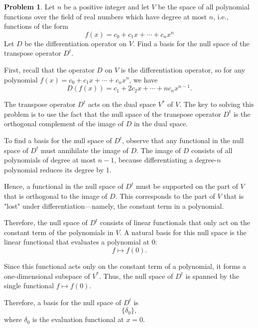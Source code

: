 \documentclass[12pt]{article}
\theoremstyle{definition}
\newtheorem{problem}{Problem}
\begin{document}
\begin{problem}
    Let $n$ be a positive integer and let $V$ be the space of all polynomial functions over the field 
    of real numbers which have degree at most $n$, i.e., functions of the form
    \[
        f(x) = c_0 + c_1x + \cdots + c_nx^n
    \]
    Let $D$ be the differentiation operator on $V$. Find a basis for the null space of the transpose
    operator $D^t$.

    \begin{solution}
        First, recall that the operator $D$ on $V$ is the differentiation operator, so for any polynomial $f(x) = c_0 + c_1x + \cdots + c_nx^n$, we have
        \[
        D(f(x)) = c_1 + 2c_2x + \cdots + nc_nx^{n-1}.
        \]
        
        The transpose operator $D^t$ acts on the dual space $V^*$ of $V$. The key to solving this problem is to use the fact that the null space of the transpose operator $D^t$ is the orthogonal complement of the image of $D$ in the dual space.

        To find a basis for the null space of $D^t$, observe that any functional in the null space of $D^t$ must annihilate the image of $D$. The image of $D$ consists of all polynomials of degree at most $n-1$, because differentiating a degree-$n$ polynomial reduces its degree by 1.

        Hence, a functional in the null space of $D^t$ must be supported on the part of $V$ that is orthogonal to the image of $D$. This corresponds to the part of $V$ that is "lost" under differentiation—namely, the constant term in a polynomial.

        Therefore, the null space of $D^t$ consists of linear functionals that only act on the constant term of the polynomials in $V$. A natural basis for this null space is the linear functional that evaluates a polynomial at 0:
        \[
        f \mapsto f(0).
        \]

        Since this functional acts only on the constant term of a polynomial, it forms a one-dimensional subspace of $V^*$. Thus, the null space of $D^t$ is spanned by the single functional $f \mapsto f(0)$.

        Therefore, a basis for the null space of $D^t$ is
        \[
        \{ \delta_0 \},
        \]
        where $\delta_0$ is the evaluation functional at $x = 0$.

    \end{solution}
\end{problem}
\end{document}
